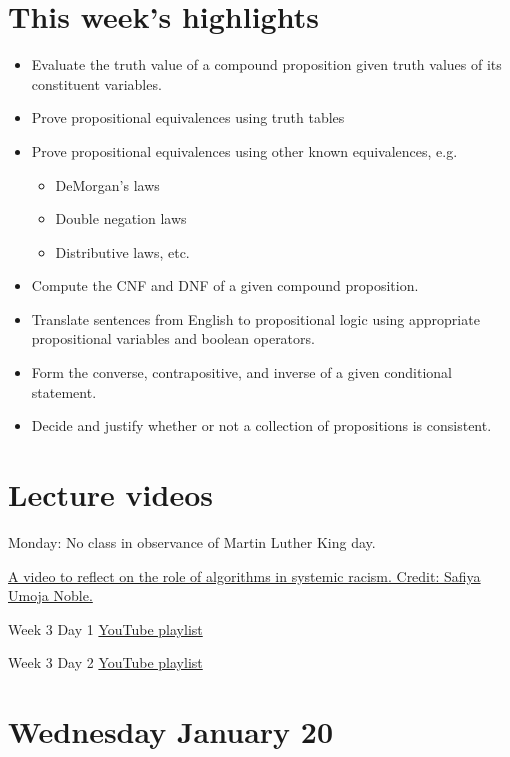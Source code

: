 \documentclass[12pt, oneside]{article}
\begin{document}
\begin{flushright}
\end{flushright}

\section*{This week's highlights}
\begin{itemize}
\item Evaluate the truth value of a compound proposition given truth values of its constituent variables.
\item Prove propositional equivalences using truth tables
\item Prove propositional equivalences using other known equivalences, e.g.
\begin{itemize}
\item DeMorgan's laws
\item Double negation laws
\item Distributive laws, etc.
\end{itemize}
\item Compute the CNF and DNF of a given compound proposition.
\item Translate sentences from English to propositional logic using appropriate propositional variables and boolean operators.
\item Form the converse, contrapositive, and inverse of a given conditional statement.
\item Decide and justify whether or not a collection of propositions is consistent.
\end{itemize}

\section*{Lecture videos}
Monday: No class in observance of Martin Luther King day.

\href{https://www.youtube.com/watch?v=6KLTpoTpkXo}{A video to reflect on the role of algorithms in
systemic racism. Credit: Safiya Umoja Noble.}

Week 3 Day 1
\href{https://youtube.com/playlist?list=PLML4QilACLk4eQeliamh26adMOwifz8Uj}{YouTube playlist}

Week 3 Day 2
\href{https://youtube.com/playlist?list=PLML4QilACLk7GdezMI_tPsCB2iJ5f7ikp}{YouTube playlist}

\newpage
\section*{Wednesday January 20}
\end{document}

